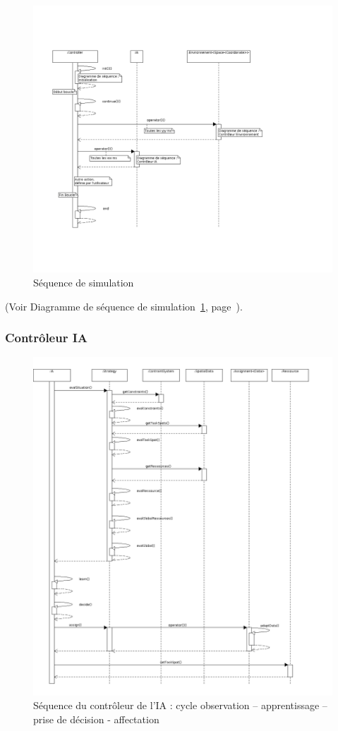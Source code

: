 %
\begin{figure}[!p]\centering
   \includegraphics[scale=0.50]{images/seq_simu.png}
   \caption{\label{seq_simu} Séquence de simulation}
\end{figure}

(Voir Diagramme de séquence de simulation~\ref{seq_simu}, page~\pageref{seq_simu}).

\subsubsection{Contrôleur IA}

\begin{figure}[!p]\centering
   \includegraphics[scale=0.43]{images/seq_ia.png}
   \caption{\label{seq_ia} Séquence du contrôleur de l'IA : cycle \og observation – apprentissage – prise de décision - affectation \fg}
\end{figure}
%
